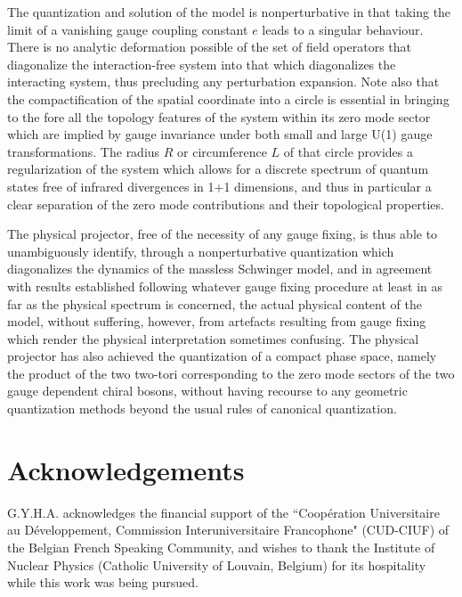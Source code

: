 \documentclass[a4paper,11pt]{article}
\begin{document}
The quantization and solution of the model is nonperturbative in that taking 
the limit of a vanishing gauge coupling constant $e$ leads to a singular 
behaviour. There is no analytic deformation possible of the set of field 
operators that diagonalize the interaction-free system into that which 
dia\-go\-na\-li\-zes the interacting system, thus precluding any perturbation 
expansion. Note also that the compactification of the spatial coordinate into 
a circle is essential in bringing to the fore all the topology features
of the system within its zero mode sector which are implied by gauge
invariance under both small and large U(1) gauge transformations. The radius 
$R$ or circumference $L$ of that circle provides a regularization of the 
system which allows for a discrete spectrum of quantum states free of infrared
divergences in 1+1 dimensions, and thus in particular a clear separation
of the zero mode contributions and their topological properties.

The physical projector, free of the necessity of any gauge fixing,
is thus able to unambiguously identify, through a nonperturbative quantization
which diagonalizes the dynamics of the massless Schwinger model, and 
in agreement with results established following whatever gauge fixing 
procedure at least in as far as the physical spectrum is concerned, the actual 
physical content of the model, without suffering, however, from artefacts 
resulting from gauge fixing which render the physical interpretation 
sometimes confusing. The physical projector has also achieved the 
quantization of a compact phase space, namely the product of the two two-tori 
corresponding to the zero mode sectors of the two gauge dependent chiral 
bosons, without having recourse to any geometric quantization methods beyond 
the usual rules of canonical quantization.

\section*{Acknowledgements}

G.Y.H.A. acknowledges the financial support of the ``Coop\'eration
Universitaire au D\'evelop\-pe\-ment, Commission Interuniversitaire
Francophone" (CUD-CIUF) of the Belgian French Speaking Community, and wishes
to thank the Institute of Nuclear Physics (Catholic University
of Louvain, Belgium) for its hos\-pi\-ta\-li\-ty while this work was being
pursued. 

\clearpage
\end{document}
